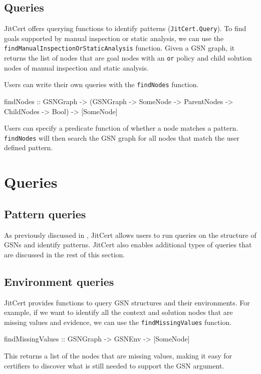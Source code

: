 \documentclass{article}
\newcommand{\jitcert}{JitCert\xspace}
\begin{document}
\subsection{Queries}
\label{subsec:patqueries}

\jitcert offers querying functions to identify patterns (\texttt{JitCert.Query}).
To find goals supported by manual inspection or static analysis, 
we can use the 
\texttt{findManualInspectionOrStaticAnalysis} function. 
Given a GSN graph, it returns the list of nodes that are goal nodes with an 
\texttt{or} policy and child solution nodes of
manual inspection and static analysis. 

Users can write their own queries with the \texttt{findNodes} function. 
\begin{code}
findNodes :: GSNGraph -> (GSNGraph -> SomeNode -> ParentNodes -> ChildNodes -> Bool) -> [SomeNode]
\end{code}
Users can specify a predicate function of whether a node matches a pattern. 
\texttt{findNodes} will then search the GSN graph for all nodes that match the user defined pattern.

\section{Queries}
\label{sec:queries}

\subsection{Pattern queries}

As previously discussed in , \jitcert allows users to run queries on the structure of GSNs and identify patterns. 
\jitcert also enables additional types of queries that are discussed in the rest of this section. 

\subsection{Environment queries}

\jitcert provides functions to query GSN structures and their environments. 
For example, if we want to identify all the context and solution nodes that are missing values and evidence, 
we can use the \texttt{findMissingValues} function.
\begin{code}
findMissingValues :: GSNGraph -> GSNEnv -> [SomeNode]
\end{code}
This returns a list of the nodes that are missing values, making it easy for certifiers to discover what is still needed to support the GSN argument. 
\end{document}

